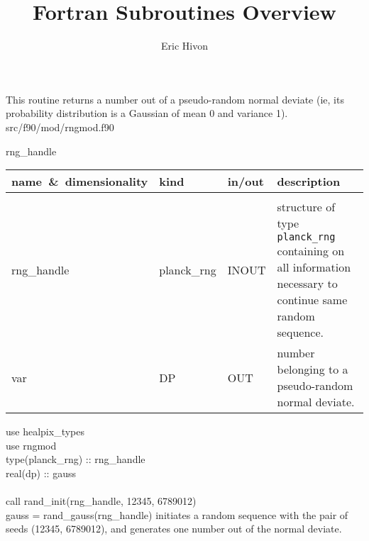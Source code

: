 
\sloppy


\title{\healpix Fortran Subroutines Overview}
 \section[rand\_gauss]{ }
\label{sub:rand_gauss}
\author{Eric Hivon}

\begin{facility}
{This routine returns a number out of a pseudo-random normal deviate (ie, its
  probability distribution is a Gaussian of mean 0 and variance 1).
}
{src/f90/mod/rngmod.f90}
\end{facility}

\begin{f90function}
{rng\_handle}
\end{f90function}

\begin{arguments}
{
\begin{tabular}{p{0.3\hsize} p{0.15\hsize} p{0.1\hsize} p{0.35\hsize}} \hline  
\textbf{name~\&~dimensionality} & \textbf{kind} & \textbf{in/out} & \textbf{description} \\ \hline
                   &   &   &                           \\ %
rng\_handle & planck\_rng & INOUT & structure of type {\tt planck\_rng}
                   containing on all information necessary to continue same
                   random sequence. \\ 
var & DP & OUT & number belonging to a pseudo-random normal deviate.
\end{tabular}
}
\end{arguments}

\begin{example}
{
use healpix\_types \\
use rngmod \\
type(planck\_rng) :: rng\_handle \\
real(dp) :: gauss \\
\\
call rand\_init(rng\_handle, 12345, 6789012)  \\
gauss = rand\_gauss(rng\_handle)
}
{
initiates a random sequence with the pair of seeds (12345, 6789012), and
generates one number out of the normal deviate.
}
\end{example}

